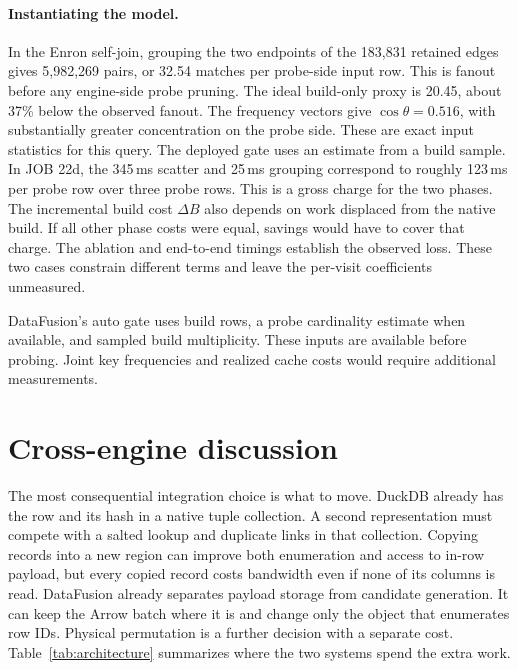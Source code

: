 \documentclass[11pt,a4paper]{article}
\begin{document}
\paragraph{Instantiating the model.}
In the Enron self-join, grouping the two endpoints of the 183,831 retained edges gives
5,982,269 pairs, or 32.54 matches per probe-side input row. This is fanout before any
engine-side probe pruning. The ideal build-only proxy is 20.45, about 37\% below the
observed fanout. The frequency vectors give $\cos\theta=0.516$, with substantially
greater concentration on the probe side. These are exact input statistics for this query.
The deployed gate uses an estimate from a build sample. In
JOB 22d, the 345\,ms scatter and 25\,ms grouping correspond to roughly 123\,ms per probe
row over three probe rows. This is a gross charge for the two phases. The incremental build cost $\Delta B$
also depends on work displaced from the native build. If all other phase costs were equal, savings would have to cover
that charge. The ablation and end-to-end timings establish the observed loss. These two
cases constrain different terms and leave the per-visit coefficients unmeasured.

DataFusion's auto gate uses build rows, a probe cardinality estimate when available, and
sampled build multiplicity. These inputs are available before probing. Joint key frequencies
and realized cache costs would require additional measurements.

\section{Cross-engine discussion}
The most consequential integration choice is what to move. DuckDB already has the row and its hash
in a native tuple collection. A second representation must compete with a salted lookup and
duplicate links in that collection. Copying records into a new region can improve both enumeration
and access to in-row payload, but every copied record costs bandwidth even if none of its columns
is read. DataFusion already separates payload storage from candidate generation. It can keep the
Arrow batch where it is and change only the object that enumerates row IDs. Physical permutation
is a further decision with a separate cost. Table~\ref{tab:architecture} summarizes where the two
systems spend the extra work.
\end{document}
